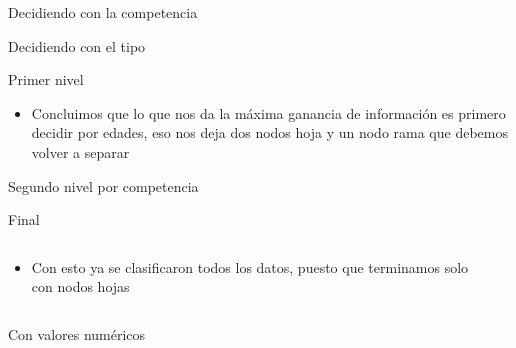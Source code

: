 \documentclass[aspectratio=169]{beamer}
\begin{document}
%
\begin{frame}{Decidiendo con la competencia}
	\begin{center}
		
	\end{center}
\end{frame}
%
\begin{frame}{Decidiendo con el tipo}
	\begin{center}
		
	\end{center}
\end{frame}
%
\begin{frame}{Primer nivel}
	\begin{itemize}
		\item Concluimos que lo que nos da la máxima ganancia de información es primero decidir por edades, eso nos deja dos nodos hoja y un nodo rama que debemos volver a separar
	\end{itemize}
\end{frame}
%
\begin{frame}{Segundo nivel por competencia}
		\begin{center}
		
	\end{center}
\end{frame}
%
\begin{frame}{Final}
	\begin{columns}
		\begin{column}{0.3\columnwidth}
			\begin{itemize}
				\item Con esto ya se clasificaron todos los datos, puesto que terminamos solo con nodos hojas
			\end{itemize}
		\end{column}
		\begin{column}{0.6\columnwidth}
			\begin{center}
				
			\end{center}
		\end{column}
	\end{columns}
\end{frame}
%
\begin{frame}{Con valores numéricos}
	\only<1>{
		\begin{center}
			
		\end{center}
	}
	\only<2>{
		\begin{center}
			
		\end{center}
	}
	\only<3>{
		\begin{center}
			
		\end{center}
	}
	\only<4>{
		\begin{center}
			
		\end{center}
	}
\end{frame}
\end{document}
